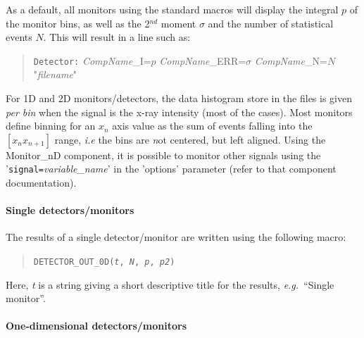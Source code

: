 As a default, all monitors using the standard macros will display the
integral $p$ of the monitor bins, as well as the 2$^{nd}$ moment $\sigma$
and the number of statistical events $N$. This will result in a line such as:

\begin{quote}
\verb+Detector:+ \textit{CompName}\_I=$p$ \textit{CompName}\_ERR=$\sigma$ \textit{CompName}\_N=$N$ "\textit{filename}"
\end{quote}

For 1D and 2D monitors/detectors, the data histogram store in the files
is given \emph{per bin} when the signal is the x-ray intensity (most of the cases). Most monitors define binning for an $x_n$ axis value as the sum of events falling into the $[ x_n x_{n+1} ]$ range, \textit{i.e} the bins are {\emph not} centered, but left aligned.
Using the Monitor\_nD component, it is possible to monitor other signals using the
'\verb+signal=+\textit{variable\_name}' in the 'options' parameter (refer to that
component documentation).

\paragraph{Single detectors/monitors}
\label{s:DETECTOR_OUT}

The results of a single detector/monitor are written using the following
macro:
\begin{quote}
  \texttt{DETECTOR\_OUT\_0D(\textit{t}, \textit{N}, \textit{p}, \textit{p2})}
\end{quote}
Here, \textit{t} is a string giving a short descriptive title for the
results, {\em e.g.}\ ``Single monitor''.


\paragraph{One-dimensional detectors/monitors}


